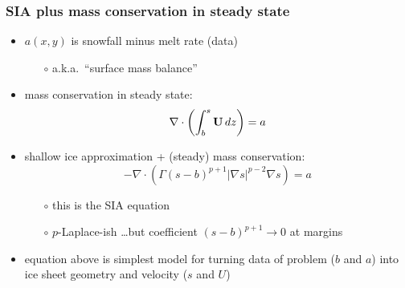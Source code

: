 \documentclass[hide notes,intlimits]{beamer}
\newcommand{\Div}{\nabla\cdot}
\begin{document}
\begin{frame}
  \frametitle{SIA plus mass conservation in steady state}

\begin{itemize}
\item $a(x,y)$ is snowfall minus melt rate (data)
  \begin{itemize}
  \item[$\circ$] a.k.a.~``surface mass balance''
  \end{itemize}
\item mass conservation in steady state: 
  $$\Div \left(  \int_b^s {\bf U}\, dz \right)  =  a$$
\item shallow ice approximation + (steady) mass conservation:
  $$-\Div \left(\Gamma (s-b)^{p+1} | \nabla s |^{p-2} \nabla s  \right) =  a$$
  \begin{itemize}
  \vspace{-0.2in}
  \item[$\circ$] this is the SIA equation
  \item[$\circ$] $p$-Laplace-ish \dots but coefficient $(s-b)^{p+1} \to 0$ at margins
  \end{itemize}
\item equation above is simplest model for turning data of problem ($b$ and $a$) into ice sheet geometry and velocity ($s$ and $U$)
\end{itemize}
\end{frame}
\end{document}
